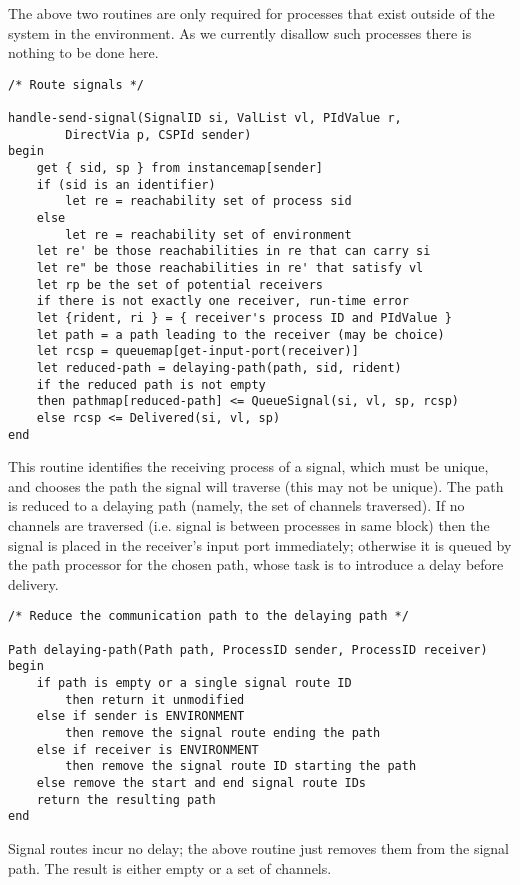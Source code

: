 The above two routines are only required for processes that exist
outside of the system in the environment. As we currently disallow
such processes there is nothing to be done here.

\begin{verbatim}
/* Route signals */

handle-send-signal(SignalID si, ValList vl, PIdValue r,
        DirectVia p, CSPId sender)
begin
    get { sid, sp } from instancemap[sender]
    if (sid is an identifier)
        let re = reachability set of process sid
    else
        let re = reachability set of environment
    let re' be those reachabilities in re that can carry si
    let re" be those reachabilities in re' that satisfy vl
    let rp be the set of potential receivers
    if there is not exactly one receiver, run-time error
    let {rident, ri } = { receiver's process ID and PIdValue }
    let path = a path leading to the receiver (may be choice)
    let rcsp = queuemap[get-input-port(receiver)]
    let reduced-path = delaying-path(path, sid, rident)
    if the reduced path is not empty
    then pathmap[reduced-path] <= QueueSignal(si, vl, sp, rcsp)
    else rcsp <= Delivered(si, vl, sp)
end
\end{verbatim}

This routine identifies the receiving process of a signal, which must
be unique, and chooses the path the signal will traverse (this may
not be unique). The path is reduced to a delaying path (namely, the
set of channels traversed). If no channels are traversed (i.e. signal 
is between processes in same block) then the signal is placed in the
receiver's input port immediately; otherwise it is queued by the path
processor for the chosen path, whose task is to introduce a delay
before delivery.

\begin{verbatim}
/* Reduce the communication path to the delaying path */

Path delaying-path(Path path, ProcessID sender, ProcessID receiver)
begin
    if path is empty or a single signal route ID
        then return it unmodified
    else if sender is ENVIRONMENT
        then remove the signal route ending the path
    else if receiver is ENVIRONMENT
        then remove the signal route ID starting the path
    else remove the start and end signal route IDs
    return the resulting path
end
\end{verbatim}

Signal routes incur no delay; the above routine just removes them
from the signal path. The result is either empty or a set of
channels.

